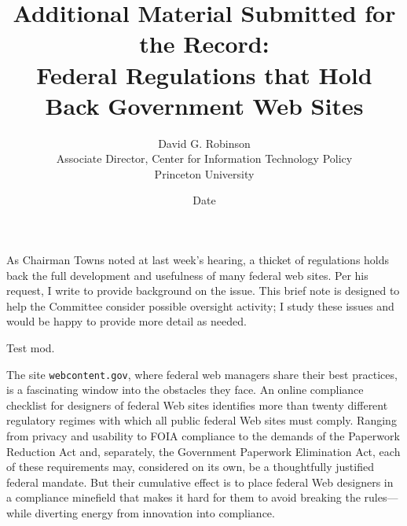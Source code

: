 \documentclass{article}
\title{Additional Material Submitted for the Record: \\
Federal Regulations that Hold Back Government Web Sites}
\author{David G. Robinson\\
Associate Director, Center for Information Technology Policy\\
Princeton University}
\date{Date}
\begin{document}
   \maketitle
 As Chairman Towns noted at last week's hearing, a thicket of regulations 
holds back the full development and usefulness of many federal web sites. Per 
his request, I write to provide background on the issue. This brief note is 
designed to help the Committee consider possible oversight activity; I study 
these issues and would be happy to provide more detail as needed.


Test mod.

The site \texttt{webcontent.gov}, where federal web managers share their best 
practices, is a fascinating window into the obstacles they face. An online 
compliance checklist for designers of federal Web sites identifies more than 
twenty different regulatory regimes with which all public federal Web sites 
must comply.  Ranging from privacy and usability to FOIA compliance to the 
demands of the Paperwork Reduction Act and, separately, the Government 
Paperwork Elimination Act, each of these requirements may, considered on its 
own, be a thoughtfully justified federal mandate. But their cumulative effect 
is to place federal Web designers in a compliance minefield that makes it hard 
for them to avoid breaking the rules—while diverting energy from innovation 
into compliance.


\end{document}
